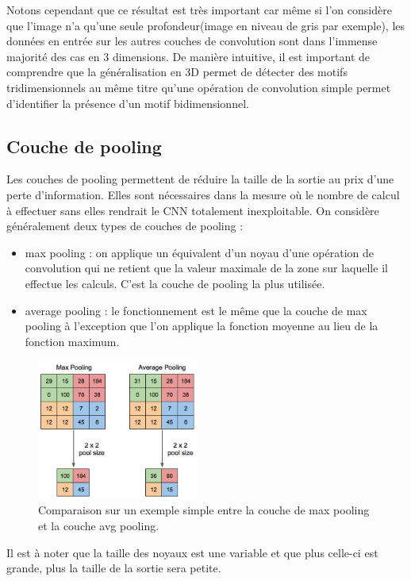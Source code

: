 Notons cependant que ce résultat est très important car même si l'on considère que l'image n'a qu'une seule profondeur(image en niveau de gris par exemple), les données en entrée sur les autres couches de convolution sont dans l'immense majorité des cas en 3 dimensions. De manière intuitive, il est important de comprendre que la généralisation en 3D permet de détecter des motifs tridimensionnels au même titre qu'une opération de convolution simple permet d'identifier la présence d'un motif bidimensionnel. 

\subsection{Couche de pooling}

Les couches de pooling permettent de réduire la taille de la sortie au prix d'une perte d'information. Elles sont nécessaires dans la mesure où le nombre de calcul à effectuer sans elles rendrait le CNN  totalement inexploitable. On considère généralement deux types de couches de pooling :

\begin{itemize}
 \item max pooling : on applique un équivalent d'un noyau d'une opération de convolution qui ne retient que la valeur maximale de la zone sur laquelle il effectue les calculs. C'est la couche de pooling la plus utilisée.
 
\item average pooling : le fonctionnement est le même que la couche de max pooling à l'exception que l'on applique la fonction moyenne au lieu de la fonction maximum. 
\end{itemize}

\begin{figure}[!h]
\centering
\includegraphics[width=150pt]{images/cnn/pooling.png}
\caption{Comparaison sur un exemple simple entre la couche de max pooling et la couche avg pooling.}
\end{figure}

Il est à noter que la taille des noyaux est une variable et que plus celle-ci est grande, plus la taille de la sortie sera petite. 
